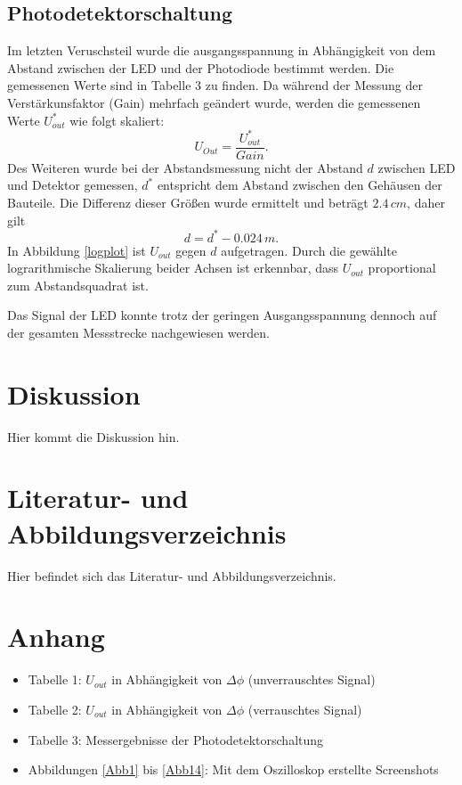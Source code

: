 \documentclass[11pt]{article}
\begin{document}
\subsection{Photodetektorschaltung}
Im letzten Veruschsteil wurde die ausgangsspannung in Abhängigkeit von dem Abstand zwischen der LED und der Photodiode bestimmt werden. Die gemessenen Werte sind  in Tabelle 3 zu finden. Da während der Messung der Verstärkunsfaktor (Gain) mehrfach geändert wurde, werden die gemessenen Werte $U_{out}^*$ wie folgt skaliert:
\begin{equation}
U_{Out} = \frac{U_{out}^*}{Gain}.
\end{equation} 
Des Weiteren wurde bei der Abstandsmessung nicht der Abstand $d$ zwischen LED und Detektor gemessen, $d^*$ entspricht dem Abstand zwischen den Gehäusen der Bauteile. Die Differenz dieser Größen wurde ermittelt und beträgt $2.4 \,cm$, daher gilt 
\begin{equation}
d = d^* - 0.024\,m .
\end{equation}
In  Abbildung \ref{logplot} ist $U_{out}$ gegen $d$ aufgetragen. Durch die gewählte lograrithmische Skalierung beider Achsen ist erkennbar, dass $U_{out}$ proportional zum Abstandsquadrat ist.

\noindent
Das Signal der LED konnte trotz der geringen Ausgangsspannung dennoch auf der gesamten Messstrecke nachgewiesen werden. 


\section{Diskussion}
Hier kommt die Diskussion hin.
\section{Literatur- und Abbildungsverzeichnis}
Hier befindet sich das Literatur- und Abbildungsverzeichnis.


\section{Anhang}
\begin{itemize}
\item Tabelle 1: $U_{out}$ in Abhängigkeit von $\Delta\phi$ (unverrauschtes Signal)
\item Tabelle 2: $U_{out}$ in Abhängigkeit von $\Delta\phi$ (verrauschtes Signal)
\item Tabelle 3: Messergebnisse der Photodetektorschaltung
\item Abbildungen \ref{Abb1} bis \ref{Abb14}: Mit dem Oszilloskop erstellte Screenshots
 
\end{itemize}
\newpage
\end{document}
